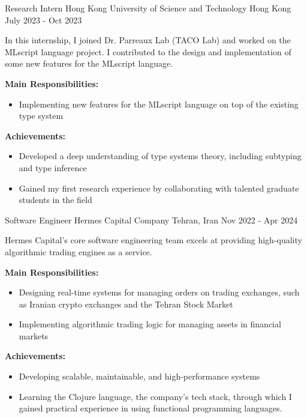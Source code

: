 \begin{cventries}
  \cventry
  {Research Intern}
  {Hong Kong University of Science and Technology}
  {Hong Kong}
  {July 2023 - Oct 2023}
  {
    \begin{cvitems}
    \item {In this internship, I joined Dr. Parreaux Lab (TACO Lab) and worked
        on the MLscript language project.  I contributed to the design and
        implementation of some new features for the MLscript language.}
    \item {\textbf{Main Responsibilities:}
        \begin{itemize}[label=-]
        \item Implementing new features for the MLscript language on top of the
          existing type system
        \end{itemize}
      }
    \item {\textbf{Achievements:}
        \begin{itemize}[label=-]
        \item Developed a deep understanding of type systems theory, including subtyping and type inference
        \item Gained my first research experience by collaborating with talented graduate students in the field
        \end{itemize}
      }
    \end{cvitems}
  }

  \cventry
  {Software Engineer}
  {Hermes Capital Company}
  {Tehran, Iran}
  {Nov 2022 - Apr 2024}
  {
    \begin{cvitems}
      \item {Hermes Capital's core software engineering team excels at providing high-quality algorithmic trading engines as a service.}
      \item {\textbf{Main Responsibilities:}
            \begin{itemize}[label=-]
                \item Designing real-time systems for managing orders on trading
                  exchanges, such as Iranian crypto exchanges and the Tehran Stock Market
                \item Implementing algorithmic trading logic for managing assets
                  in financial markets
            \end{itemize}
            }
      \item {\textbf{Achievements:}
            \begin{itemize}[label=-]
                \item Developing scalable, maintainable, and high-performance systems
                \item Learning the Clojure language, the company’s tech stack,
                  through which I gained practical experience in using
                  functional programming languages.
            \end{itemize}
            }
    \end{cvitems}
  }


\end{cventries}
